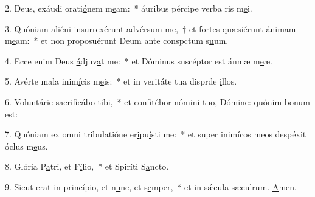 2. Deus, exáudi orati\uline{ó}nem m\uline{e}am:~* áuribus pércipe verba ris m\uline{e}i.\par 
3. Quóniam aliéni insurrexérunt ad\uline{vér}sum me,~† et fortes quæsiérunt \uline{á}nimam m\uline{e}am:~* et non proposuérunt Deum ante conspctum s\uline{u}um.\par 
4. Ecce enim Deus \uline{á}djuv\uline{a}t me:~* et Dóminus suscéptor est ánmæ m\uline{e}æ.\par 
5. Avérte mala inim\uline{í}cis m\uline{e}is:~* et in veritáte tua disprde \uline{i}llos.\par 
6. Voluntárie sacrific\uline{á}bo t\uline{i}bi,~* et confitébor nómini tuo, Dómine: quónim bon\uline{u}m est:\par 
7. Quóniam ex omni tribulatióne er\uline{i}pu\uline{í}sti me:~* et super inimícos meos despéxit óclus m\uline{e}us.\par 
8. Glória P\uline{a}tri, et F\uline{í}lio,~* et Spiríti S\uline{a}ncto.\par 
9. Sicut erat in princípio, et n\uline{u}nc, et s\uline{e}mper,~* et in sǽcula sæculrum. \uline{A}men.\par 
